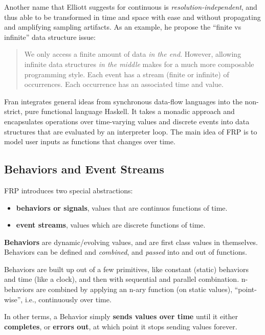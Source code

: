 Another name that Elliott suggests for continuous is
\emph{resolution-independent}, and thus able to be transformed in time
and space with ease and without propagating and amplifying sampling
artifacts. As an example, he propose the ``finite vs infinite'' data
structure issue:

\begin{quote}
We only access a finite amount of data \emph{in the end}. However,
allowing infinite data structures \emph{in the middle} makes for a much
more composable programming style. Each event has a stream (finite or
infinite) of occurrences. Each occurrence has an associated time and
value.
\end{quote}

Fran integrates general ideas from synchronous data-flow languages into
the non-strict, pure functional language Haskell. It takes a monadic
approach and encapsulates operations over time-varying values and
discrete events into data structures that are evaluated by an
interpreter loop. The main idea of FRP is to model user inputs as
functions that changes over time.


\subsection{Behaviors and Event Streams}\label{behaviors-and-event-streams}

FRP introduces two special abstractions:

\begin{itemize}
\itemsep1pt\parskip0pt
\item
  \textbf{behaviors or signals}, values that are continuos functions of
  time.
\item
  \textbf{event streams}, values which are discrete functions of time.
\end{itemize}

\textbf{Behaviors} are dynamic/evolving values, and are first class
values in themselves. Behaviors can be defined and \emph{combined}, and
\emph{passed} into and out of functions.

Behaviors are built up out of a few primitives, like constant (static)
behaviors and time (like a clock), and then with sequential and parallel
combination. n-behaviors are combined by applying an n-ary function (on
static values), ``point-wise'', i.e., continuously over time.

In other terms, a Behavior simply \textbf{sends values over time} until
it either \textbf{completes}, or \textbf{errors out}, at which point it
stops sending values forever.

